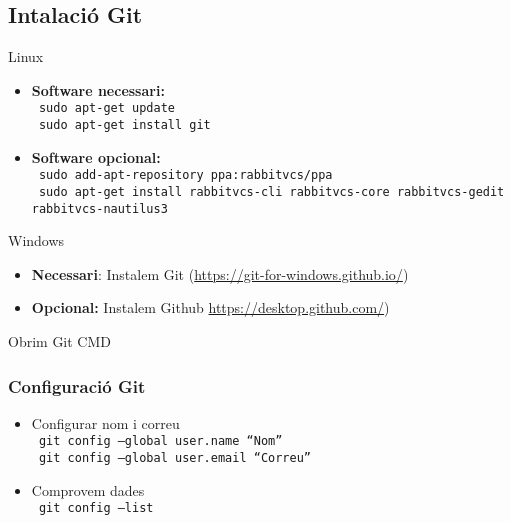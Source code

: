 \documentclass{beamer}
\newcommand{\shellcmd}[1]{{\color{blue}\indent\indent\texttt{\footnotesize\ #1}\\}}
\begin{document}
\subsection{Intalaci\'o Git}
\begin{frame}
	
		\begin{block}{Linux}
			\begin{itemize}
				\item \textbf{Software necessari:} \\
				\shellcmd{sudo apt-get update}
				\shellcmd{sudo apt-get install git} \vspace{0.2cm}
				\item \textbf{Software opcional:} \\
				\shellcmd{sudo add-apt-repository ppa:rabbitvcs/ppa}
				\shellcmd{sudo apt-get install rabbitvcs-cli rabbitvcs-core rabbitvcs-gedit rabbitvcs-nautilus3}
			\end{itemize}
			
		\end{block}
		
		

		\begin{block}{Windows}
			\begin{itemize}
				\item \textbf{Necessari}: Instalem Git (\url{https://git-for-windows.github.io/})
				\item \textbf{Opcional:}  Instalem Github \url {https://desktop.github.com/})
			\end{itemize}
			{\small Obrim Git CMD}
		\end{block}

	
\end{frame}


\begin{frame}
	\frametitle{Configuraci\'o Git}
	
	\begin{itemize}
		\item Configurar nom i correu\\
		\shellcmd{git config --global user.name ``Nom''}
		\shellcmd{git config --global user.email ``Correu''}
		\item Comprovem dades\\ 
		\shellcmd{git config --list}
		
	\end{itemize}
	
	

\end{frame}
\end{document}

